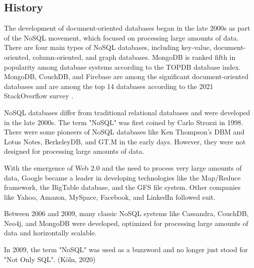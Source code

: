 \subsection{History}

The development of document-oriented databases began in the late 2000s as part of the NoSQL 
movement, which focused on processing large amounts of data. There are four main types of NoSQL 
databases, including key-value, document-oriented, column-oriented, and graph databases. 
MongoDB is ranked fifth in popularity among database systems according to the TOPDB database 
index. MongoDB, CouchDB, and Firebase are among the significant document-oriented databases and 
are among the top 14 databases according to the 2021 StackOverflow survey \parencite[p. 41]{Eisermann2022}. 

NoSQL databases differ from traditional relational databases and were developed in the late 2000s.
The term "NoSQL" was first coined by Carlo Strozzi in 1998. There were some pioneers of NoSQL 
databases like Ken Thompson's DBM and Lotus Notes, BerkeleyDB, and GT.M in the early days. 
However, they were not designed for processing large amounts of data.

With the emergence of Web 2.0 and the need to process very large amounts of data, Google became 
a leader in developing technologies like the Map/Reduce framework, the BigTable database, and 
the GFS file system. Other companies like Yahoo, Amazon, MySpace, Facebook, and LinkedIn followed 
suit.

Between 2006 and 2009, many classic NoSQL systems like Cassandra, CouchDB, Neo4j, and MongoDB 
were developed, optimized for processing large amounts of data and horizontally scalable.

In 2009, the term "NoSQL" was used as a buzzword and no longer just stood for "Not Only SQL". 
(Köln, 2020)




